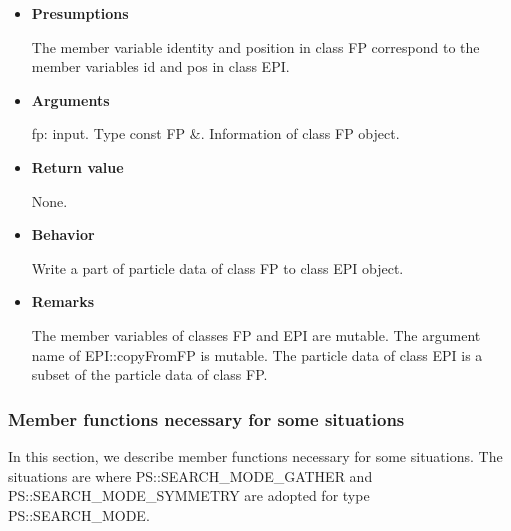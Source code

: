 \begin{itemize}

\item {\bf Presumptions}

  The member variable identity and position in class FP correspond to
  the member variables id and pos in class EPI.

\item {\bf Arguments}

  fp: input. Type const FP \&. Information of class FP object.
  
\item {\bf Return value}

  None.
  
\item {\bf Behavior}

  Write a part of particle data of class FP to class EPI object.
  
\item {\bf Remarks}

  The member variables of classes FP and EPI are mutable. The argument
  name of EPI::copyFromFP is mutable. The particle data of class EPI
  is a subset of the particle data of class FP. 

\end{itemize}

\subsubsection{Member functions necessary for some situations}


In this section, we describe member functions necessary for some
situations. The situations are where PS::SEARCH\_MODE\_GATHER and
PS::SEARCH\_MODE\_SYMMETRY are adopted for type PS::SEARCH\_MODE.

